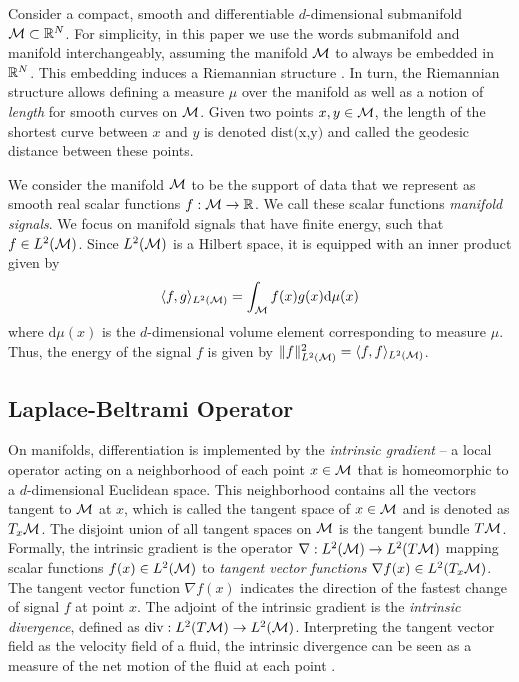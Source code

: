 
Consider a compact, smooth and differentiable $d$-dimensional submanifold ${\mathcal M} \subset {\mathbb R}^N$. For simplicity, in this paper we use the words submanifold and manifold interchangeably, assuming the manifold ${\mathcal M}$ to always be embedded in ${\mathbb R}^N$. This embedding induces a Riemannian structure \cite{gallier2020differential}.
In turn, the Riemannian structure allows defining a measure $\mu$ over the manifold as well as a notion of \emph{length} for smooth curves on ${\mathcal M}$. Given two points $x, y\in{\ensuremath{\mathcal M}}$, the length of the shortest curve between $x$ and $y$ is denoted $\text{dist(x,y)}$ and called the geodesic distance between these points.

We consider the manifold ${\mathcal M}$ to be the support of data that we represent as smooth real scalar functions $f:{\mathcal M}\rightarrow {\mathbb R}$. We call these scalar functions \emph{manifold signals}. We focus on manifold signals that have finite energy, such that $f \in L^2({\mathcal M})$. Since  $L^2({\mathcal M})$ is a Hilbert space, it is equipped with an inner product given by
\begin{equation}\label{eqn:innerproduct}
    \langle f,g \rangle_{L^2({\mathcal M})}=\int_{\mathcal M} f(x)g(x) \text{d}\mu(x) 
\end{equation}
where $\text{d}\mu(x)$ is the $d$-dimensional volume element corresponding to measure $\mu$. Thus, the energy of the signal $f$ is given by $\|f\|^2_{L^2({\mathcal M})}={\langle f,f \rangle_{L^2({\mathcal M})}}$.



\subsection{Laplace-Beltrami Operator}\label{sec_lb}

On manifolds, differentiation is implemented by the \emph{intrinsic gradient} -- a local operator acting on a neighborhood of each point $x \in {\ensuremath{\mathcal M}}$ that is homeomorphic to a $d$-dimensional Euclidean space. This neighborhood contains all the vectors tangent to ${\mathcal M}$ at $x$, which is called the tangent space of $x \in {\ensuremath{\mathcal M}}$ and is denoted as $T_x{\mathcal M}$. The disjoint union of all tangent spaces on ${\mathcal M}$ is the tangent bundle $T{\mathcal M}$. Formally, the intrinsic gradient is the operator $\nabla: L^2({\mathcal M})\rightarrow L^2(T{\mathcal M})$ mapping scalar functions $f(x) \in L^2({\mathcal M})$ to \textit{tangent vector functions} $\nabla f(x) \in L^2(T_x{\mathcal M})$. The tangent vector function $\nabla f(x)$ indicates the direction of the fastest change of signal $f$ at point $x$. The adjoint of the intrinsic gradient is the \emph{intrinsic divergence}, defined as $\text{div}: L^2(T{\mathcal M})\rightarrow L^2({\mathcal M})$. Interpreting the tangent vector field as the velocity field of a fluid, the intrinsic divergence can be seen as a measure of the net motion of the fluid at each point \cite{bronstein2017geometric}. 

